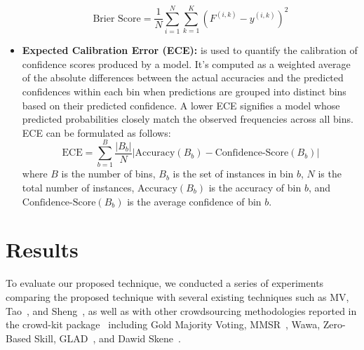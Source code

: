 \begin{itemize}
    \begin{equation}
    \text{Brier Score} = \frac{1}{N} \sum_{i=1}^{N} \sum_{k=1}^{K} {\left(F^{(i,k)} - y^{(i,k)}\right)}^2
    \end{equation}
    \item \textbf{Expected Calibration Error (ECE):}  is used to quantify the calibration of  confidence scores produced by a model. It's computed as a weighted average of the absolute differences between the actual accuracies and the predicted confidences within each bin when predictions are grouped into distinct bins based on their predicted confidence. A lower ECE signifies a model whose predicted probabilities closely match the observed frequencies across all bins. ECE can be formulated as follows:
    \begin{equation}
    \text{ECE} = \sum_{b=1}^{B} \frac{ \vert B_b \vert }{N} \left\vert {\text{Accuracy} ( B_{b} ) - \text{Confidence-Score}(B_b)} \right\vert
    \end{equation}
    where $B$ is the number of bins, $B_b$ is the set of instances in bin $b$, $N$ is the total number of instances, $\text{Accuracy} (B_b)$ is the accuracy of bin $b$, and $\text{Confidence-Score} (B_b)$ is the average confidence of bin $b$.
\end{itemize}
%
\section{Results}\label{sec:crowd.results}
To evaluate our proposed technique, we conducted a series of experiments comparing the proposed technique with several existing techniques such as MV, Tao~\cite{tao_Label_2020}, and Sheng~\cite{sheng_Majority_2019}, as well as with other crowdsourcing methodologies reported in the crowd-kit package~\cite{ustalov_learning_2021} including Gold Majority Voting, MMSR~\cite{ma_Adversarial_2020}, Wawa, Zero-Based Skill, GLAD~\cite{whitehill_Whose_2009}, and Dawid Skene~\cite{dawid_Maximum_1979}.
%
